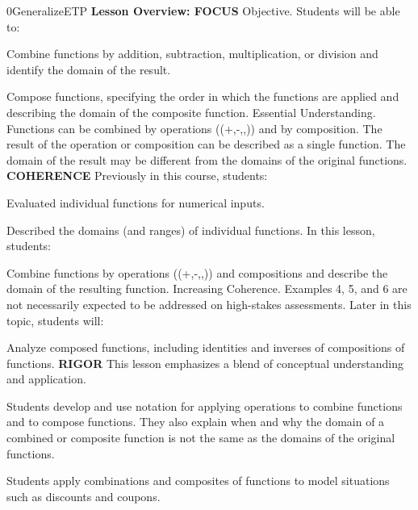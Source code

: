 \documentclass{article}
\newenvironment{te-addendum}[2]{}{}     %
\begin{document}
\begin{te-addendum}{0}{GeneralizeETP}
\textbf{Lesson Overview: FOCUS}
Objective. Students will be able to:
\item Combine functions by addition, subtraction, multiplication, or division and identify the domain of the result.
\item Compose functions, specifying the order in which the functions are applied and describing the domain of the composite function.
Essential Understanding. Functions can be combined by operations ((+,-,\times,\div)) and by composition. The result of the operation or composition can be described as a single function. The domain of the result may be different from the domains of the original functions.
\textbf{COHERENCE}
Previously in this course, students:
\item Evaluated individual functions for numerical inputs.
\item Described the domains (and ranges) of individual functions.
In this lesson, students:
\item Combine functions by operations ((+,-,\times,\div)) and compositions and describe the domain of the resulting function.
Increasing Coherence. Examples 4, 5, and 6 are not necessarily expected to be addressed on high-stakes assessments.
Later in this topic, students will:
\item Analyze composed functions, including identities and inverses of compositions of functions.
\textbf{RIGOR}
This lesson emphasizes a blend of conceptual understanding and application.
\item Students develop and use notation for applying operations to combine functions and to compose functions. They also explain when and why the domain of a combined or composite function is not the same as the domains of the original functions.
\item Students apply combinations and composites of functions to model situations such as discounts and coupons.
\end{te-addendum}
\end{document}
